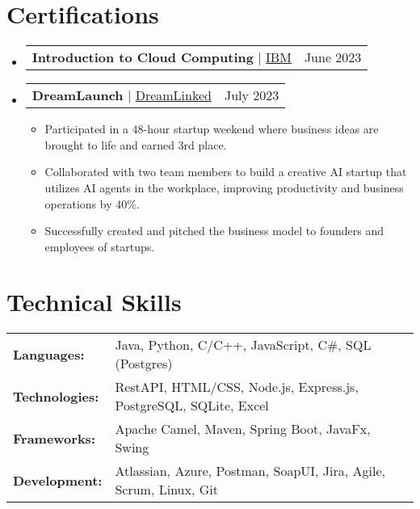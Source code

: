\documentclass[letterpaper,11pt]{article}
\makeatletter
\newcommand{\resumeItem}[1]{
  \item\small{
    {#1 \vspace{-2pt}}
  }
}
\newcommand{\resumeProjectHeading}[2]{
    \item
    \begin{tabular*}{0.97\textwidth}{l@{\extracolsep{\fill}}r}
      \small#1 & #2 \\
    \end{tabular*}\vspace{-7pt}
}
\newcommand{\resumeSubHeadingListStart}{\begin{itemize}[leftmargin=0.15in, label={}]}
\newcommand{\resumeSubHeadingListEnd}{\end{itemize}}
\newcommand{\resumeItemListStart}{\begin{itemize}}
\newcommand{\resumeItemListEnd}{\end{itemize}\vspace{-5pt}}
\makeatother
\begin{document}
\section{Certifications}
    \resumeSubHeadingListStart
      \resumeProjectHeading
          {\textbf{Introduction to Cloud Computing} $|$ \href{https://www.coursera.org/account/accomplishments/certificate/WAG9BRR6M9MM}{{IBM}}}{June 2023}
    \resumeSubHeadingListEnd
    \resumeSubHeadingListStart
      \resumeProjectHeading
      {\textbf{DreamLaunch} $|$ \href{https://dreamlinked.ca/}{{DreamLinked}}}{July 2023}
      \resumeItemListStart
        \resumeItem{Participated in a 48-hour startup weekend where business ideas are brought to life and earned 3rd place.}
        \resumeItem{Collaborated with two team members to build a creative AI startup that utilizes AI agents in the workplace, improving productivity and business operations by 40\%.}
        \resumeItem{Successfully created and pitched the business model to founders and employees of startups.}
      \resumeItemListEnd
      \resumeItemListEnd
%
\section{Technical Skills}
 \begin{itemize}[leftmargin=0.15in, label={}]
    \begin{tabular}{ l l }
    \textbf{Languages:} & Java, Python, C/C++, JavaScript, C\#, SQL (Postgres)         \\
    \textbf{Technologies: } & RestAPI, HTML/CSS, Node.js, Express.js, PostgreSQL, SQLite, Excel \\
    \textbf{Frameworks: } & Apache Camel, Maven, Spring Boot, JavaFx, Swing \\
    \textbf{Development: } & Atlassian, Azure, Postman, SoapUI, Jira, Agile, Scrum, Linux, Git \\
\end{tabular}
\vspace{2mm}
 \end{itemize}


\end{document}
